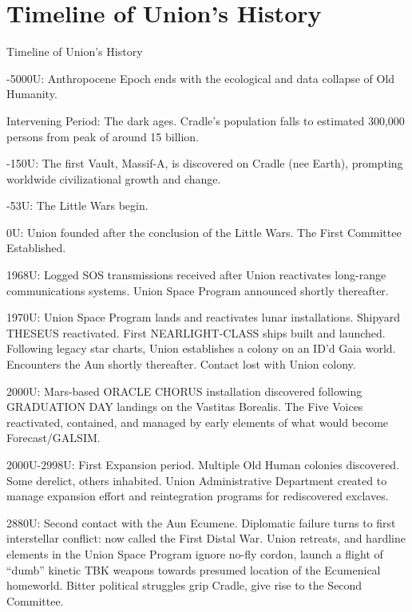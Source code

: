 \section{Timeline of Union's History}

Timeline of Union’s History  

-5000U: Anthropocene Epoch ends with the ecological and data collapse of Old Humanity. 
 

Intervening Period: The dark ages. Cradle’s population falls to estimated 300,000 persons from  
peak of around 15 billion. 
 

-150U: The first Vault, Massif-A, is discovered on Cradle (nee Earth), prompting worldwide  
civilizational growth and change.
 

-53U: The Little Wars begin.  
 
 
 
0U: Union founded after the conclusion of the Little Wars. The First Committee Established. 
 

1968U: Logged SOS transmissions received after Union reactivates long-range communications  
systems. Union Space Program announced shortly thereafter.
 

1970U: Union Space Program lands and reactivates lunar installations. Shipyard THESEUS  
reactivated. First  NEARLIGHT-CLASS ships built and launched. Following legacy star charts,  
Union establishes a colony on an ID’d Gaia world. Encounters the Aun shortly thereafter. Contact  
lost with Union colony.  
 
 
 
2000U: Mars-based ORACLE CHORUS installation discovered following GRADUATION DAY  
landings on the Vastitas Borealis. The Five Voices reactivated, contained, and managed by early  
elements of what would become Forecast/GALSIM.
 

2000U-2998U: First Expansion period. Multiple Old Human colonies discovered. Some derelict,  
others inhabited. Union Administrative Department created to manage expansion effort and  
reintegration programs for rediscovered exclaves.  
 

2880U: Second contact with the Aun Ecumene. Diplomatic failure turns to first interstellar  
conflict: now called the First Distal War. Union retreats, and hardline elements in the Union Space  
Program ignore no-fly cordon, launch a flight of “dumb” kinetic TBK weapons towards presumed  
location of the Ecumenical homeworld. Bitter political struggles grip Cradle, give rise to the  
Second Committee.  
 

